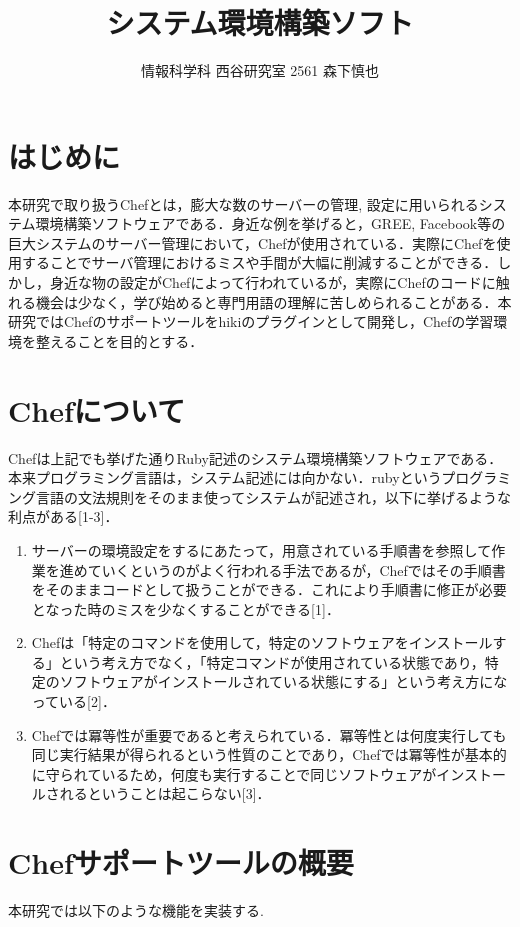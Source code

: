 \documentclass[a4j,twocolumn]{jsarticle}
\begin{document}
\title{システム環境構築ソフト}
\author{情報科学科 西谷研究室 2561 森下慎也}
\date{}
\maketitle
\section{はじめに}
本研究で取り扱うChefとは，膨大な数のサーバーの管理, 設定に用いられるシステム環境構築ソフトウェアである．身近な例を挙げると，GREE, Facebook等の巨大システムのサーバー管理において，Chefが使用されている．実際にChefを使用することでサーバ管理におけるミスや手間が大幅に削減することができる．しかし，身近な物の設定がChefによって行われているが，実際にChefのコードに触れる機会は少なく，学び始めると専門用語の理解に苦しめられることがある．本研究ではChefのサポートツールをhikiのプラグインとして開発し，Chefの学習環境を整えることを目的とする．

\section{Chefについて}
Chefは上記でも挙げた通りRuby記述のシステム環境構築ソフトウェアである．本来プログラミング言語は，システム記述には向かない．rubyというプログラミング言語の文法規則をそのまま使ってシステムが記述され，以下に挙げるような利点がある[1-3]．
\begin{enumerate}
\item サーバーの環境設定をするにあたって，用意されている手順書を参照して作業を進めていくというのがよく行われる手法であるが，Chefではその手順書をそのままコードとして扱うことができる．これにより手順書に修正が必要となった時のミスを少なくすることができる[1]．
\item Chefは「特定のコマンドを使用して，特定のソフトウェアをインストールする」という考え方でなく，「特定コマンドが使用されている状態であり，特定のソフトウェアがインストールされている状態にする」という考え方になっている[2]．
\item Chefでは冪等性が重要であると考えられている．冪等性とは何度実行しても同じ実行結果が得られるという性質のことであり，Chefでは冪等性が基本的に守られているため，何度も実行することで同じソフトウェアがインストールされるということは起こらない[3]．
\end{enumerate}
\section{Chefサポートツールの概要}
本研究では以下のような機能を実装する.
\end{document}

